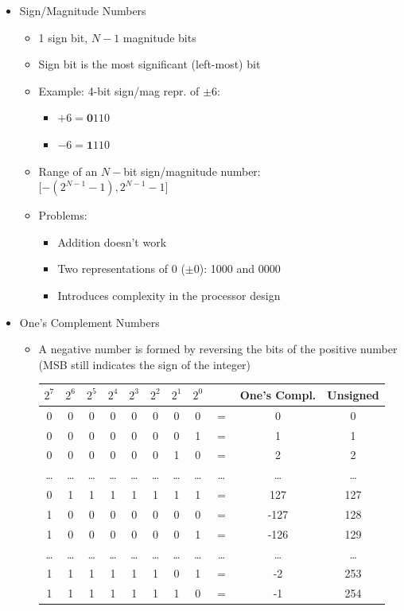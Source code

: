 \documentclass[a4paper]{article}
\begin{document}
\begin{itemize}
\begin{itemize}
\item Sign/Magnitude Numbers
\begin{itemize}
\item 1 sign bit, $N-1$ magnitude bits
\item Sign bit is the most significant (left-most) bit
\item Example: 4-bit sign/mag repr. of $\pm 6$:
\begin{itemize}
\item $+6=\textbf{0}110$
\item $-6=\textbf{1}110$
\end{itemize}
\item Range of an $N-$bit sign/magnitude number:\\
$\lbrack -\left( 2^{N-1}-1\right),2^{N-1}-1\rbrack$
\item Problems:
\begin{itemize}
\item Addition doesn't work
\item Two representations of 0 ($\pm 0$): 1000 and 0000
\item Introduces complexity in the processor design
\end{itemize}
\end{itemize}
\item One's Complement Numbers
\begin{itemize}
\item A negative number is formed by reversing the bits of the positive number (MSB still indicates the sign of the integer)\\
\begin{tabular}{|c|c|c|c|c|c|c|c|c|c|c|}
\hline
$2^7$&$2^6$&$2^5$&$2^4$&$2^3$&$2^2$&$2^1$&$2^0$&{}&One's Compl.&Unsigned\\\hline\hline
0&0&0&0&0&0&0&0&$=$&0&0\\
0&0&0&0&0&0&0&1&$=$&1&1\\
0&0&0&0&0&0&1&0&$=$&2&2\\
\dots&\dots&\dots&\dots&\dots&\dots&\dots&\dots&\dots&\dots&\dots\\
0&1&1&1&1&1&1&1&$=$&127&127\\
1&0&0&0&0&0&0&0&$=$&-127&128\\
1&0&0&0&0&0&0&1&$=$&-126&129\\
\dots&\dots&\dots&\dots&\dots&\dots&\dots&\dots&\dots&\dots&\dots\\
1&1&1&1&1&1&0&1&$=$&-2&253\\
1&1&1&1&1&1&1&0&$=$&-1&254\\

\end{tabular}
\end{itemize}
\end{itemize}
\end{itemize}
\end{document}
